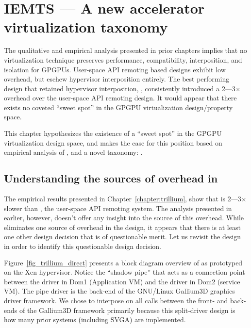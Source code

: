 \chapter{IEMTS --- A new accelerator virtualization taxonomy}
\label{chapter:iemts}


The qualitative and empirical analysis presented in prior chapters implies
that no virtualization technique preserves performance, compatibility,
interposition, and isolation for GPGPUs. User-space API remoting based designs
exhibit low overhead, but eschew hypervisor interposition entirely. The best
performing design that retained hypervisor interposition, \Trillium,
consistently introduced a 2---3$\times$ overhead over the user-space API
remoting design. It would appear that there exists no coveted ``sweet spot''
in the GPGPU virtualization design/property space.

This chapter hypothesizes the existence of a ``sweet spot'' in the GPGPU
virtualization design space, and makes the case for this position based on
empirical analysis of \Trillium, and a novel taxonomy: \iemts.

\section{Understanding the sources of overhead in \Trillium}
The empirical results presented in Chapter~\ref{chapter:trillium},
show that \Trillium is 2---3$\times$ slower than \apigpu,
the user-space API remoting system. The analysis presented in earlier,
however, doesn't offer any insight into the source of this overhead. While
\Trillium eliminates one source of overhead in the \XenSVGA design, it appears
that there is at least one other design decision that is of questionable
merit. Let us revisit the \Trillium design in order to identify this
questionable design decision.

Figure~\ref{fig_trillium_direct} presents a block diagram overview of
\Trillium as prototyped on the Xen hypervisor. Notice the ``shadow pipe'' that
acts as a connection point between the driver in Dom1 (Application VM) and the
driver in Dom2 (service VM). The pipe driver is the back-end of the GNU/Linux
Gallium3D graphics driver framework. We chose to interpose on all calls
between the front- and back-ends of the Gallium3D framework primarily because
this split-driver design is how many prior systems (including SVGA) are
implemented.

